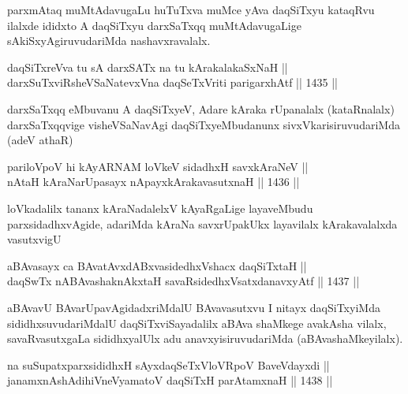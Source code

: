 \begin{artha}
parxmAtaq muMtAdavugaLu huTuTxva muMce yAva daqSiTxyu kataqRvu ilalxde ididxto A daqSiTxyu darxSaTxqq muMtAdavugaLige sAkiSxyAgiruvudariMda nashavxravalalx.
\end{artha}


\begin{shl}
daqSiTxreVva tu sA darxSATx na tu kArakalakaSxNaH || \\
darxSuTxviRsheVSaNatevxVna daqSeTxVriti parigarxhAtf \hfill || 1435 ||  
\end{shl}

\begin{artha}
darxSaTxqq eMbuvanu A daqSiTxyeV, Adare kAraka rUpanalalx (kataRnalalx) darxSaTxqqvige visheVSaNavAgi daqSiTxyeMbudanunx sivxVkarisiruvudariMda (adeV athaR)
\end{artha}


\begin{shl}
pariloVpoV hi kAyARNAM loVkeV sidadhxH savxkAraNeV || \\
nAtaH kAraNarUpasayx nApayxkArakavasutxnaH \hfill || 1436 ||  
\end{shl}

\begin{artha}
loVkadalilx tananx kAraNadalelxV kAyaRgaLige layaveMbudu parxsidadhxvAgide, adariMda kAraNa savxrUpakUkx layavilalx kArakavalalxda vasutxvigU
\end{artha}


\begin{shl}
aBAvasayx ca BAvatAvxdABxvasidedhxVshacx daqSiTxtaH || \\
daqSwTx nABAvashaknAkx\s taH savaRsidedhxVsatxdanavxyAtf \hfill || 1437 ||  
\end{shl}

\begin{artha}
aBAvavU BAvarUpavAgidadxriMdalU BAvavasutxvu I nitayx daqSiTxyiMda sididhxsuvudariMdalU daqSiTxviSayadalilx aBAva shaMkege avakAsha vilalx, savaRvasutxgaLa sididhxyalUlx adu anavxyisiruvudariMda (aBAvashaMkeyilalx).
\end{artha}


\begin{shl}
na suSupatxparxsididhxH sAyxdaqSeTxVloVRpoV BaveVdayxdi || \\
janamxnAshAdihiVneVyamatoV daqSiTxH parAtamxnaH \hfill || 1438 ||  
\end{shl}

